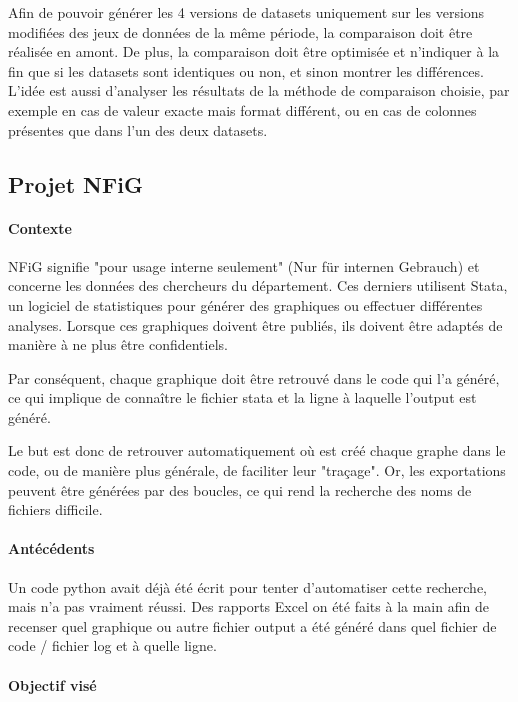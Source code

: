 Afin de pouvoir générer les 4 versions de datasets uniquement sur les versions modifiées des jeux de données de la même période, la comparaison doit être réalisée en amont.
De plus, la comparaison doit être optimisée et n'indiquer à la fin que si les datasets sont identiques ou non, et sinon montrer les différences.
L'idée est aussi d'analyser les résultats de la méthode de comparaison choisie, par exemple en cas de valeur exacte mais format différent, ou en cas de colonnes présentes que dans l'un des deux datasets.
\\
\subsection{Projet NFiG}

\paragraph{Contexte}

NFiG signifie "pour usage interne seulement" (Nur für internen Gebrauch) et concerne les données des chercheurs du département. 
Ces derniers utilisent Stata, un logiciel de statistiques pour générer des graphiques ou effectuer différentes analyses.
Lorsque ces graphiques doivent être publiés, ils doivent être adaptés de manière à ne plus être confidentiels.

Par conséquent, chaque graphique doit être retrouvé dans le code qui l'a généré, ce qui implique de connaître le fichier stata et la ligne à laquelle l'output est généré.

Le but est donc de retrouver automatiquement où est créé chaque graphe dans le code, ou de manière plus générale, de faciliter leur "traçage".
Or, les exportations peuvent être générées par des boucles, ce qui rend la recherche des noms de fichiers difficile.

\paragraph{Antécédents}

Un code python avait déjà été écrit pour tenter d'automatiser cette recherche, mais n'a pas vraiment réussi.
Des rapports Excel on été faits à la main afin de recenser quel graphique ou autre fichier output a été généré dans quel fichier de code / fichier log et à quelle ligne. 

\paragraph{Objectif visé}

